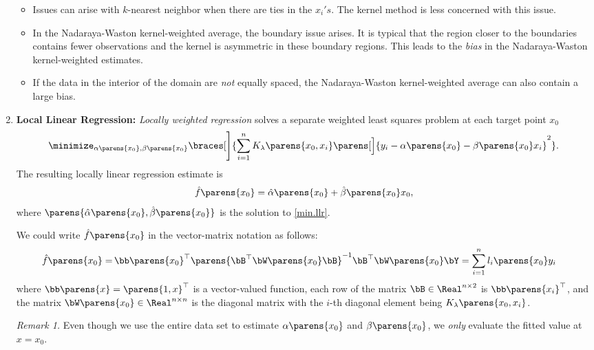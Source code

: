 \documentclass[12pt]{article}
\begin{document}
\begin{enumerate}[label=\textbf{\arabic*.}]
\begin{itemize}
		\item Issues can arise with $k$-nearest neighbor when there are ties in the $x_i's$. The kernel method is less concerned with this issue. 
		
		\item In the Nadaraya-Waston kernel-weighted average, the boundary issue arises. It is typical that the region closer to the boundaries contains fewer observations and the kernel is asymmetric in these boundary regions. This leads to the \emph{bias} in the Nadaraya-Waston kernel-weighted estimates. 
		
		\item If the data in the interior of the domain are \emph{not} equally spaced, the Nadaraya-Waston kernel-weighted average can also contain a large bias. 

	\end{itemize}
	
	\item \textbf{Local Linear Regression:} \emph{Locally weighted regression} solves a separate weighted least squares problem at each target point $x_0$ 
	\begin{align}\label{min.llr}
		\minimize_{\alpha \parens{x_0}, \beta \parens{x_0}} \braces[\Bigg]{\sum_{i=1}^n K_\lambda \parens{x_0, x_i} \parens[\Big]{ y_i - \alpha \parens{x_0} - \beta \parens{x_0} x_i}^2}. 
	\end{align}
	The resulting locally linear regression estimate is 
	\begin{align*}
		\hat{f} \parens{x_0} = \hat{\alpha} \parens{x_0} + \hat{\beta} \parens{x_0} x_0, 
	\end{align*}
	where $\parens{\hat{\alpha} \parens{x_0}, \hat{\beta} \parens{x_0}}$ is the solution to \eqref{min.llr}. 
	
	We could write $\hat{f} \parens{x_0}$ in the vector-matrix notation as follows: 
	\begin{align}
		\hat{f}\parens{x_0} = & \, \bb \parens{x_0}^\top \parens{\bB^\top \bW \parens{x_0} \bB}^{-1} \bB^\top \bW \parens{x_0} \bY 
		= \sum_{i=1}^n l_i \parens{x_0} y_i \label{llr.sol}
	\end{align}
	where $\bb \parens{x} = \parens{1, x}^\top$ is a vector-valued function, each row of the matrix $\bB \in \Real^{n \times 2}$ is $\bb \parens{x_i}^\top$, and the matrix $\bW \parens{x_0} \in \Real^{n \times n}$ is the diagonal matrix with the $i$-th diagonal element being $K_{\lambda} \parens{x_0, x_i}$. 
	
	\textit{Remark 1.} Even though we use the entire data set to estimate $\alpha\parens{x_0}$ and $\beta\parens{x_0}$, we \emph{only} evaluate the fitted value at $x = x_0$. 
	

\end{enumerate}
\end{document}
